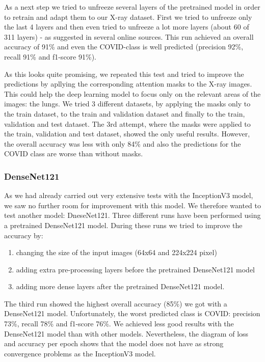 \documentclass{article}
\begin{document}
As a next step we tried to unfreeze several layers of the pretrained model in order to retrain and adapt them to our X-ray dataset. First we tried to unfreeze only the last 4 layers and then even tried to unfreeze a lot more layers (about 60 of 311 layers) - as suggested in several online sources. This run achieved an overall accuracy of 91\% and even the COVID-class is well predicted (precision 92\%, recall 91\% and f1-score 91\%). 

As this looks quite promising, we repeated this test and tried to improve the predictions by apllying the corresponding attention masks to the X-ray images. This could help the deep learning model to focus only on the relevant areas of the images: the lungs. We tried 3 different datasets, by applying the masks only to the train dataset, to the train and validation dataset and finally to the train, validation and test dataset. The 3rd attempt, where the masks were applied to the train, validation and test dataset, showed the only useful results. However, the overall accuracy was less with only 84\% and also the predictions for the COVID class are worse than without masks. 



\subsubsection{DenseNet121} 
As we had already carried out very extensive tests with the InceptionV3 model, we saw no further room for improvement with this model. We therefore wanted to test another model: DneseNet121. Three different runs have been performed using a pretrained DenseNet121 model. During these runs we tried to improve the accuracy by: 
\begin{enumerate}
    \item changing the size of the input images (64x64 and 224x224 pixel)
    \item adding extra pre-processing layers before the pretrained DenseNet121 model 
    \item adding more dense layers after the pretrained DenseNet121 model.
\end{enumerate}

The third run showed the highest overall accuracy (85\%) we got with a DenseNet121 model. Unfortunately, the worst predicted class is COVID: precision 73\%, recall 78\% and f1-score 76\%. 
We achieved less good results with the DenseNet121 model than with other models. Nevertheless, the diagram of loss and accuracy per epoch shows that the model does not have as strong convergence problems as the InceptionV3 model. 
\end{document}
